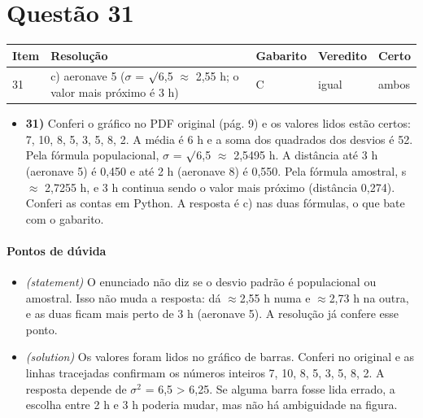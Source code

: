 \documentclass{article}%
\begin{document}
\section*{Questão 31}%
\begin{longtable}{@{}p{} p{} p{} p{} p{}@{}}\toprule Item & Resolução & Gabarito & Veredito & Certo \\ \midrule
31 & c) aeronave 5 ($\sigma$ = $\surd$6,5 $\approx$ 2,55 h; o valor mais próximo é 3 h) & C & igual & ambos \\
\bottomrule\end{longtable}%
\begin{itemize}%
\item%
\textbf{31)} Conferi o gráfico no PDF original (pág. 9) e os valores lidos estão certos: 7, 10, 8, 5, 3, 5, 8, 2. A média é 6 h e a soma dos quadrados dos desvios é 52. Pela fórmula populacional, $\sigma$ = $\surd$6,5 $\approx$ 2,5495 h. A distância até 3 h (aeronave 5) é 0,450 e até 2 h (aeronave 8) é 0,550. Pela fórmula amostral, s $\approx$ 2,7255 h, e 3 h continua sendo o valor mais próximo (distância 0,274). Conferi as contas em Python. A resposta é c) nas duas fórmulas, o que bate com o gabarito.%
\end{itemize}%
\paragraph{Pontos de dúvida}%
\begin{itemize}%
\item%
\textit{(statement)} O enunciado não diz se o desvio padrão é populacional ou amostral. Isso não muda a resposta: dá $\approx$2,55 h numa e $\approx$2,73 h na outra, e as duas ficam mais perto de 3 h (aeronave 5). A resolução já confere esse ponto.%
\item%
\textit{(solution)} Os valores foram lidos no gráfico de barras. Conferi no original e as linhas tracejadas confirmam os números inteiros 7, 10, 8, 5, 3, 5, 8, 2. A resposta depende de $\sigma$$^2$ = 6,5 > 6,25. Se alguma barra fosse lida errado, a escolha entre 2 h e 3 h poderia mudar, mas não há ambiguidade na figura.%
\end{itemize}%
\end{document}
